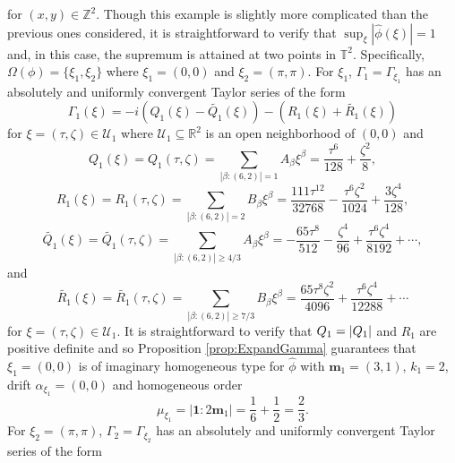 \documentclass[11pt]{article}
\newenvironment{example}
  {\pushQED{\qed}\renewcommand{\qedsymbol}{$\triangle$}\examplex}
  {\popQED\endexamplex}
\theoremstyle{remark}
\newcommand{\f}[2]{\frac{#1}{#2}}
\begin{document}
\begin{example}
\begin{equation*}
\end{equation*}
for $(x,y)\in\mathbb{Z}^2$. Though this example is slightly more complicated than the previous ones considered, it is straightforward to verify that $\sup_{\xi}|\widehat{\phi}(\xi)|=1$ and, in this case, the supremum is attained at two points in $\mathbb{T}^2$. Specifically, $\Omega(\phi)=\{\xi_1,\xi_2\}$ where $\xi_1=(0,0)$ and $\xi_2=(\pi,\pi)$. For $\xi_1$, $\Gamma_1=\Gamma_{\xi_1}$ has an absolutely and uniformly convergent Taylor series of the form
\begin{equation*}
    \Gamma_{1}(\xi)=-i\left(Q_{1}(\xi)-\widetilde{Q_1}(\xi)\right)-\left(R_1(\xi)+\widetilde{R_1}(\xi)\right)
\end{equation*}
for $\xi=(\tau,\zeta)\in\mathcal{U}_1$ where $\mathcal{U}_1\subseteq\mathbb{R}^2$ is an open neighborhood of $(0,0)$ and
\begin{equation*}
    Q_{1}(\xi)=Q_1(\tau,\zeta)=\sum_{|\beta:(6,2)|=1}A_\beta \xi^\beta=\frac{\tau^6}{128}+\frac{\zeta^2}{8},
\end{equation*}
\begin{equation*}
    R_1(\xi)=R_1(\tau,\zeta)=\sum_{|\beta:(6,2)|=2}B_\beta\xi^\beta=\frac{111\tau^{12}}{32768}-\frac{\tau^6 \zeta^2}{1024}+\frac{3\zeta^4}{128},
\end{equation*}
\begin{equation*}
    \widetilde{Q_1}(\xi)=\widetilde{Q_1}(\tau,\zeta)=\sum_{|\beta:(6,2)|\geq 4/3}A_\beta \xi^\beta=-\f{65\tau^8}{512} -\f{\zeta^4}{96} + \frac{\tau^6\zeta^4}{8192} 
    +\cdots,
\end{equation*}
and
\begin{equation*}
    \widetilde{R_1}(\xi)=\widetilde{R_1}(\tau,\zeta)=\sum_{|\beta:(6,2)|\geq 7/3}B_\beta\xi^\beta=\f{65\tau^8\zeta^2}{4096}  + \f{\tau^6 \zeta^4}{12288} + \cdots
\end{equation*}
for $\xi=(\tau,\zeta)\in\mathcal{U}_1$. It is straightforward to verify that $Q_1=\abs{Q_1}$ and $R_1$ are positive definite and so Proposition \ref{prop:ExpandGamma} guarantees that $\xi_1=(0,0)$ is of imaginary homogeneous type for $\widehat{\phi}$ with $\mathbf{m}_1=(3,1)$, $k_1=2$, drift $\alpha_{\xi_1}=(0,0)$ and homogeneous order
\begin{equation*}
    \mu_{\xi_1}=|\mathbf{1}:2\mathbf{m}_1|=\frac{1}{6}+\frac{1}{2}=\frac{2}{3}.
\end{equation*}
For $\xi_2 = (\pi,\pi)$, $\Gamma_2=\Gamma_{\xi_2}$ has an absolutely and uniformly convergent Taylor series of the form
\begin{equation*}

\end{equation*}
\end{example}
\end{document}
